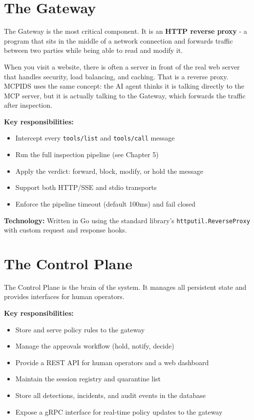 \documentclass[12pt,a4paper]{report}
\begin{document}
\section{The Gateway}

The Gateway is the most critical component. It is an \textbf{HTTP reverse
proxy} - a program that sits in the middle of a network connection and
forwards traffic between two parties while being able to read and modify it.

\begin{infobox}
When you visit a website, there is often a server in front of the real
web server that handles security, load balancing, and caching. That is a
reverse proxy. MCPIDS uses the same concept: the AI agent thinks it is
talking directly to the MCP server, but it is actually talking to the
Gateway, which forwards the traffic after inspection.
\end{infobox}

\textbf{Key responsibilities:}
\begin{itemize}
  \item Intercept every \texttt{tools/list} and \texttt{tools/call} message
  \item Run the full inspection pipeline (see Chapter 5)
  \item Apply the verdict: forward, block, modify, or hold the message
  \item Support both HTTP/SSE and stdio transports
  \item Enforce the pipeline timeout (default 100ms) and fail closed
\end{itemize}

\textbf{Technology:} Written in Go using the standard library's
\texttt{httputil.ReverseProxy} with custom request and response hooks.

\section{The Control Plane}

The Control Plane is the brain of the system. It manages all persistent state
and provides interfaces for human operators.

\textbf{Key responsibilities:}
\begin{itemize}
  \item Store and serve policy rules to the gateway
  \item Manage the approvals workflow (hold, notify, decide)
  \item Provide a REST API for human operators and a web dashboard
  \item Maintain the session registry and quarantine list
  \item Store all detections, incidents, and audit events in the database
  \item Expose a gRPC interface for real-time policy updates to the gateway
\end{itemize}
\end{document}
